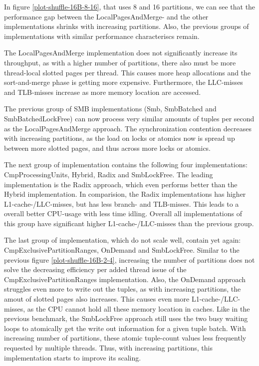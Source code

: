 In figure \ref{plot-shuffle-16B-8-16}, that uses 8 and 16 partitions, we can see that the performance gap between the LocalPagesAndMerge- and the other implementations shrinks with increasing partitions.
Also, the previous groups of implementations with similar performance characteriscs remain.

The LocalPagesAndMerge implementation does not significantly increase its throughput, as with a higher number of partitions, there also must be more thread-local slotted pages per thread.
This causes more heap allocations and the sort-and-merge phase is getting more expensive.
Furthermore, the \ac{LLC}-misses and \ac{TLB}-misses increase as more memory location are accessed.

The previous group of SMB implementations (Smb, SmbBatched and SmbBatchedLockFree) can now process very similar amounts of tuples per second as the LocalPagesAndMerge approach.
The synchronization contention decreases with increasing partitions, as the load on locks or atomics now is spread up between more slotted pages, and thus across more locks or atomics.

The next group of implementation contains the following four implementations: CmpProcessingUnits, Hybrid, Radix and SmbLockFree.
The leading implementation is the Radix approach, which even performs better than the Hybrid implementation.
In comparision, the Radix implementations has higher L1-cache-/LLC-misses, but has less branch- and TLB-misses.
This leads to a overall better CPU-usage with less time idling.
Overall all implementations of this group have significant higher L1-cache-/LLC-misses than the previous group.

The last group of implementation, which do not scale well, contain yet again: CmpExclusivePartitionRanges, OnDemand and SmbLockFree.
Similar to the previous figure \ref{plot-shuffle-16B-2-4}, increasing the number of partitions does not solve the decreasing efficiency per added thread issue of the CmpExclusivePartitionRanges implementation.
Also, the OnDemand approach struggles even more to write out the tuples, as with increasing partitions, the amout of slotted pages also increases.
This causes even more L1-cache-/LLC-misses, as the \ac{CPU} cannot hold all these memory location in caches.
Like in the previous benchmark, the SmbLockFree approach still uses the two busy waiting loops to atomically get the write out information for a given tuple batch.
With increasing number of partitions, these atomic tuple-count values less frequently requested by multiple threads.
Thus, with increasing partitions, this implementation starts to improve its scaling.
